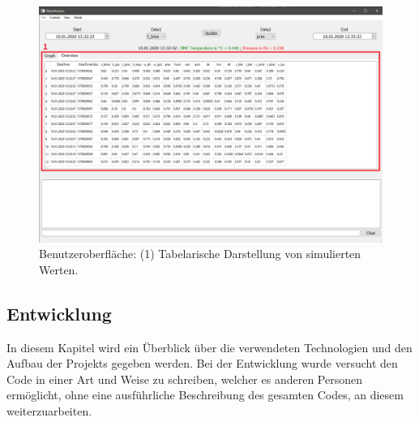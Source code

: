 \begin{figure}[H]
  \centering
  \includegraphics[width=\textwidth]{./img/ui_simulated_table}
  \caption{Benutzeroberfläche: (1) Tabelarische Darstellung von simulierten Werten.}\label{fig:ui_table}
\end{figure}

\subsection{Entwicklung}\label{sec:bo_entwicklung}
In diesem Kapitel wird ein Überblick über die verwendeten Technologien und den Aufbau der Projekts gegeben werden. Bei der Entwicklung wurde versucht den Code in einer Art und Weise zu schreiben, welcher es anderen Personen ermöglicht, ohne eine ausführliche Beschreibung des gesamten Codes, an diesem weiterzuarbeiten.

